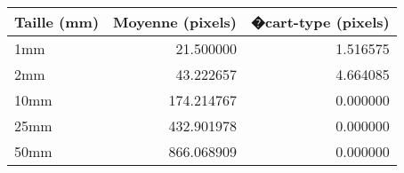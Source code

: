 \begin{tabular}{lrr}
\toprule
Taille (mm) & Moyenne (pixels) & �cart-type (pixels) \\
\midrule
1mm & 21.500000 & 1.516575 \\
2mm & 43.222657 & 4.664085 \\
10mm & 174.214767 & 0.000000 \\
25mm & 432.901978 & 0.000000 \\
50mm & 866.068909 & 0.000000 \\
\bottomrule
\end{tabular}
